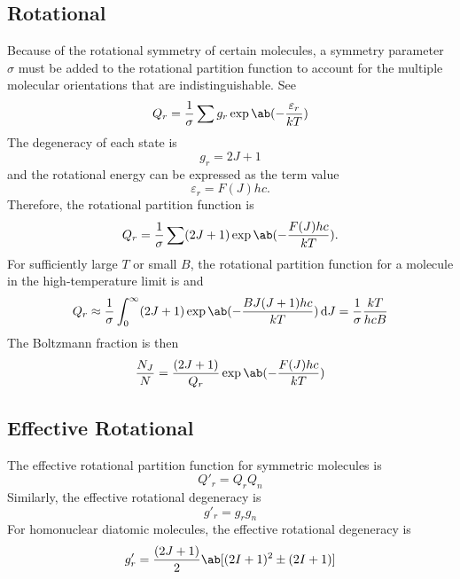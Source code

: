 \subsection{Rotational}
Because of the rotational symmetry of certain molecules, a symmetry parameter $\sigma$ must be added to the rotational partition function to account for the multiple molecular orientations that are indistinguishable.
See \cite[125]{herzbergMolecularSpectraMolecular1950}
\begin{equation*}
    Q_r = \frac{1}{\sigma} \sum g_r\exp\ab(-\frac{\varepsilon_r}{kT})
\end{equation*}
The degeneracy of each state is
\begin{equation*}
    g_r = 2J + 1
\end{equation*}
and the rotational energy can be expressed as the term value
\begin{equation*}
    \varepsilon_r = F(J)hc.
\end{equation*}
Therefore, the rotational partition function is
\begin{equation*}
    Q_r = \frac{1}{\sigma} \sum (2J + 1)\exp\ab(-\frac{F(J)hc}{kT}).
\end{equation*}
For sufficiently large $T$ or small $B$, the rotational partition function for a molecule in the high-temperature limit is \cite[17]{hansonSpectroscopyOpticalDiagnostics2016} and \cite[125]{herzbergMolecularSpectraMolecular1950}
\begin{equation*}
    Q_r \approx \frac{1}{\sigma} \int_0^{\infty} (2J + 1)\exp\ab(-\frac{BJ(J + 1)hc}{kT}) \odif{J} = \frac{1}{\sigma}\frac{kT}{hcB}
\end{equation*}
The Boltzmann fraction is then
\begin{equation*}
    \frac{N_J}{N} = \frac{(2J + 1)}{Q_r}\exp\ab(-\frac{F(J)hc}{kT})
\end{equation*}

\subsection{Effective Rotational}

The effective rotational partition function for symmetric molecules is \cite[80]{hansonSpectroscopyOpticalDiagnostics2016}
\begin{equation*}
    Q'_r = Q_rQ_n
\end{equation*}
Similarly, the effective rotational degeneracy is \cite[80]{hansonSpectroscopyOpticalDiagnostics2016}
\begin{equation*}
    g'_r = g_rg_n
\end{equation*}
For homonuclear diatomic molecules, the effective rotational degeneracy is \cite[84]{hansonSpectroscopyOpticalDiagnostics2016}
\begin{equation*}
    g'_r = \frac{(2J + 1)}{2}\ab[(2I + 1)^2 \pm (2I + 1)]
\end{equation*}


